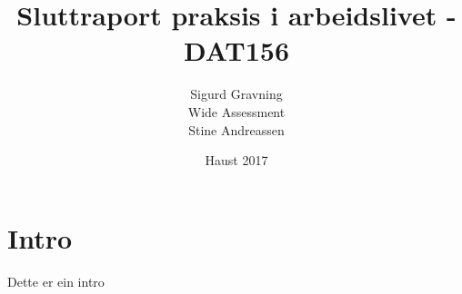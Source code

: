 \documentclass[12pt]{article}
\title{Sluttraport praksis i arbeidslivet - DAT156}
\date{Haust 2017}
\author{Sigurd Gravning \\Wide Assessment \\Stine Andreassen}
\begin{document}
\maketitle
{}
\newpage
{}

\section{Intro}
	Dette er ein intro
\end{document}
